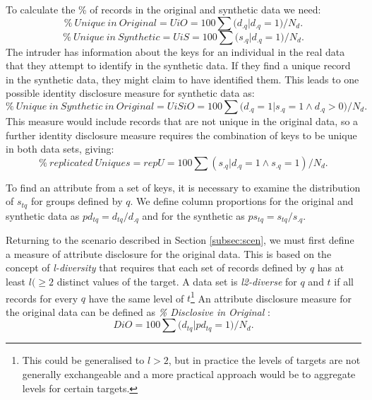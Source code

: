 \documentclass[12pt]{article}
\begin{document}
To calculate the \% of records in the original and synthetic data we need:
\begin{equation}
    \%~Unique~in~Original = UiO = 100\sum{(d_{.q} |d_{.q} = 1})/N_d. 
\end{equation}
\begin{equation}
    \%~Unique~in~Synthetic = UiS = 100\sum{(s_{.q} |d_{.q} = 1})/N_d.
\end{equation}
The intruder has information about the keys for an individual in the real data that they attempt to identify in the synthetic data. If they find a  unique record in the synthetic data, they might claim to have identified them. This leads to one possible identity disclosure measure for synthetic data as:
\begin{equation}
    \%~Unique~in~Synthetic~in~Original = UiSiO = 100 \sum{(d_{.q} = 1 |s_{.q} = 1 \land d_{.q} > 0})/N_d.
\end{equation}
This measure would include records that are not unique in the original data, so a further identity disclosure measure requires the combination of keys to be unique in both data sets, giving:
\begin{equation}
    \%~replicated~Uniques = repU = 100\sum{(s_{.q} |d_{.q} = 1 \land s_{.q} = 1)}/N_d.
\end{equation}

To find an attribute from a set of keys, it is necessary to examine the distribution of $s_{tq}$ for groups defined by $q$. We define column proportions for the original and synthetic data as $pd_{tq} = d_{tq}/d_{.q}$ and for the synthetic as $ps_{tq} = s_{tq}/s_{.q}$.

Returning to the scenario described in Section \ref{subsec:scen}, we must first define a measure of attribute disclosure for the original data. This is based on the concept of \textit{l-diversity} \cite{ldiv} that requires that each set of records defined by $q$ has at least $l(\ge{2}$ distinct values of the target. A data set is \textit{l2-diverse} for $q$ and $t$ if all records for every $q$ have the same level of $t$\footnote{This could be generalised to $l>2$, but in practice the levels of targets are not generally exchangeable and a more practical approach would be to aggregate levels for certain targets.} An attribute disclosure measure for the original data can be defined as \textit{\% Disclosive in Original} :
\begin{equation}
  DiO = 100\sum{(d_{tq} |pd_{tq} = 1})/N_d.
\end{equation}
\end{document}
